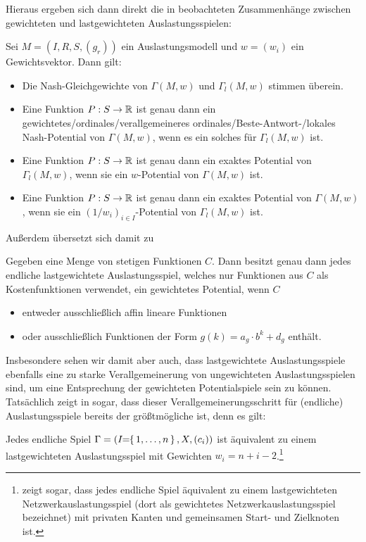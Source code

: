 Hieraus ergeben sich dann direkt die in \cite{CharExGewPotinWCG} beobachteten Zusammenhänge zwischen gewichteten und lastgewichteten Auslastungsspielen:

\begin{kor}
	Sei $M = (I, R, S, (g_r))$ ein Auslastungsmodell und $w = (w_i)$ ein Gewichtsvektor. Dann gilt:
	\begin{itemize}
		\item Die Nash-Gleichgewichte von $\Gamma(M, w)$ und $\Gamma_l(M,w)$ stimmen überein.
		\item Eine Funktion $P: S \to \mathbb{R}$ ist genau dann ein gewichtetes/ordinales/verallgemeineres ordinales/Beste-Antwort-/lokales Nash-Potential von $\Gamma(M, w)$, wenn es ein solches für $\Gamma_l(M,w)$ ist.
		\item Eine Funktion $P: S \to \mathbb{R}$ ist genau dann ein exaktes Potential von $\Gamma_l(M, w)$, wenn sie ein $w$-Potential von $\Gamma(M,w)$ ist.
		\item Eine Funktion $P: S \to \mathbb{R}$ ist genau dann ein exaktes Potential von $\Gamma(M, w)$, wenn sie ein $(1/w_i)_{i \in I}$-Potential von $\Gamma_l(M,w)$ ist.		
	\end{itemize}
\end{kor}

Außerdem übersetzt sich damit  zu 
\begin{kor}\label{kor:CharExGewPotinLWCG}
	Gegeben eine Menge von stetigen Funktionen $C$. Dann besitzt genau dann jedes endliche lastgewichtete Auslastungsspiel, welches nur Funktionen aus $C$ als Kostenfunktionen verwendet, ein gewichtetes Potential, wenn $C$
	\begin{itemize}
		\item entweder ausschließlich affin lineare Funktionen
		\item oder ausschließlich Funktionen der Form $g(k) = a_g\cdot b^k + d_g$ enthält.
	\end{itemize}
\end{kor}

Insbesondere sehen wir damit aber auch, dass lastgewichtete Auslastungsspiele ebenfalls eine zu starke Verallgemeinerung von ungewichteten Auslastungsspielen sind, um eine Entsprechung der gewichteten Potentialspiele sein zu können. Tatsächlich zeigt \citeauthor{ReprOfFiniteGamesAsNCG} in \cite[Theorem 1]{ReprOfFiniteGamesAsNCG} sogar, dass dieser Verallgemeinerungsschritt für (endliche) Auslastungsspiele bereits der größtmögliche ist, denn es gilt:

\begin{satz}\label{satz:JedesSpielLastGewAusl}
	Jedes endliche Spiel $\Gamma = (I\!\!=\!\!\set{1, \dots, n}, X, (c_i))$ ist äquivalent zu einem lastgewichteten Auslastungsspiel mit Gewichten $w_i = n + i -2$.\footnote{\citeauthor{ReprOfFiniteGamesAsNCG} zeigt sogar, dass jedes endliche Spiel äquivalent zu einem lastgewichteten Netzwerkauslastungsspiel (dort als \glqq gewichtetes Netzwerkauslastungsspiel\grqq{} bezeichnet) mit privaten Kanten und gemeinsamen Start- und Zielknoten ist.}
\end{satz}

